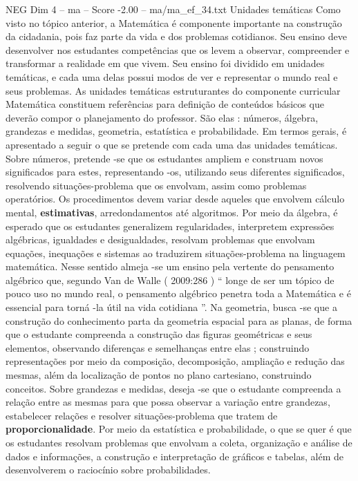 \begin{textsample}{NEG Dim 4 – ma – Score -2.00 – ma/ma\_ef\_34.txt}  \label{ex:f4_neg_237}
Unidades temáticas Como visto no tópico anterior, a Matemática é componente importante na construção da cidadania, pois faz parte da vida e dos problemas cotidianos.
Seu ensino deve desenvolver nos estudantes competências que os levem a observar, compreender e transformar a realidade em que vivem.
Seu ensino foi dividido em unidades temáticas, e cada uma delas possui modos de ver e representar o mundo real e seus problemas.
As unidades temáticas estruturantes do componente curricular Matemática constituem referências para definição de conteúdos básicos que deverão compor o planejamento do professor.
São elas : números, álgebra, grandezas e medidas, geometria, estatística e probabilidade.
Em termos gerais, é apresentado a seguir o que se pretende com cada uma das unidades temáticas.
Sobre números, pretende -se que os estudantes ampliem e construam novos significados para estes, representando -os, utilizando seus diferentes significados, resolvendo situações-problema que os envolvam, assim como problemas operatórios.
Os procedimentos devem variar desde aqueles que envolvem cálculo mental, \textbf{estimativas}, arredondamentos até algoritmos.
Por meio da álgebra, é esperado que os estudantes generalizem regularidades, interpretem expressões algébricas, igualdades e desigualdades, resolvam problemas que envolvam equações, inequações e sistemas ao traduzirem situações-problema na linguagem matemática.
Nesse sentido almeja -se um ensino pela vertente do pensamento algébrico que, segundo Van de Walle ( 2009:286 ) “ longe de ser um tópico de pouco uso no mundo real, o pensamento algébrico penetra toda a Matemática e é essencial para torná -la útil na vida cotidiana ”.
Na geometria, busca -se que a construção do conhecimento parta da geometria espacial para as planas, de forma que o estudante compreenda a construção das figuras geométricas e seus elementos, observando diferenças e semelhanças entre elas ; construindo representações por meio da composição, decomposição, ampliação e redução das mesmas, além da localização de pontos no plano cartesiano, construindo conceitos.
Sobre grandezas e medidas, deseja -se que o estudante compreenda a relação entre as mesmas para que possa observar a variação entre grandezas, estabelecer relações e resolver situações-problema que tratem de \textbf{proporcionalidade}.
Por meio da estatística e probabilidade, o que se quer é que os estudantes resolvam problemas que envolvam a coleta, organização e análise de dados e informações, a construção e interpretação de gráficos e tabelas, além de desenvolverem o raciocínio sobre probabilidades.

\end{textsample}
